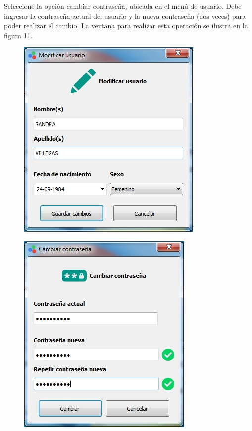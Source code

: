 	Seleccione la opci\'{o}n cambiar contrase\~{n}a, ubicada en el men\'{u} de usuario. Debe ingresar la contrase\~{n}a actual del usuario y la nueva contrase\~{n}a (dos veces) para poder realizar el cambio. La ventana para realizar esta operaci\'{o}n se ilustra en la figura 11.

\begin{figure}[H]
\centering
\begin{minipage}{.5\textwidth}
  \centering
  \includegraphics[width=.9\linewidth]{./img/modificar-usuario.jpg}
  \label{fig:test1}
\end{minipage}%
\begin{minipage}{.5\textwidth}
  \centering
  \includegraphics[width=.9\linewidth]{./img/cambiar-clave.jpg}

\end{minipage}
\end{figure}
